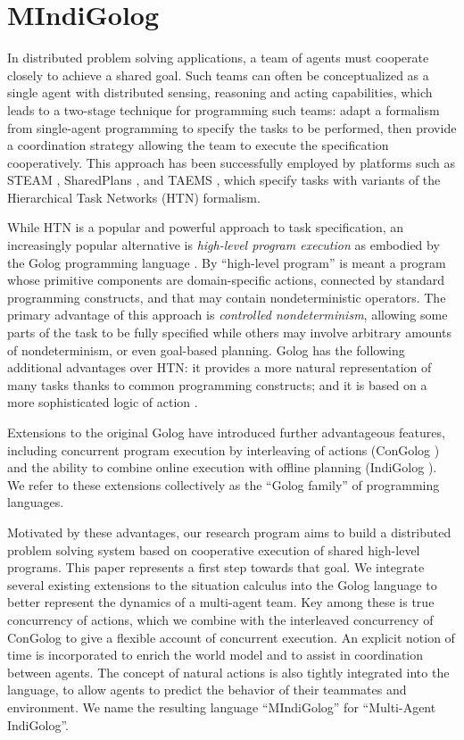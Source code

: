  


\chapter{MIndiGolog}

\label{ch:mindigolog} 

In distributed problem solving applications, a team of agents must
cooperate closely to achieve a shared goal. Such teams can often be
conceptualized as a single agent with distributed sensing, reasoning
and acting capabilities, which leads to a two-stage technique for
programming such teams: adapt a formalism from single-agent programming
to specify the tasks to be performed, then provide a coordination
strategy allowing the team to execute the specification cooperatively.
This approach has been successfully employed by platforms such as
STEAM \cite{tambe97flexible_teamwork}, SharedPlans \cite{grosz99planning_together},
and TAEMS \cite{decker95designing_coordination}, which specify tasks
with variants of the Hierarchical Task Networks (HTN) formalism.

While HTN is a popular and powerful approach to task specification,
an increasingly popular alternative is \emph{high-level program execution}
as embodied by the Golog programming language \cite{levesque97golog}.
By {}``high-level program'' is meant a program whose primitive components
are domain-specific actions, connected by standard programming constructs,
and that may contain nondeterministic operators. The primary advantage
of this approach is \emph{controlled nondeterminism}, allowing some
parts of the task to be fully specified while others may involve arbitrary
amounts of nondeterminism, or even goal-based planning. Golog has
the following additional advantages over HTN: it provides a more natural
representation of many tasks thanks to common programming constructs;
and it is based on a more sophisticated logic of action \cite{son00htn_golog}.

Extensions to the original Golog have introduced further advantageous
features, including concurrent program execution by interleaving of
actions (ConGolog \cite{giacomo00congolog}) and the ability to combine
online execution with offline planning (IndiGolog \cite{giacomo99indigolog}).
We refer to these extensions collectively as the {}``Golog family''
of programming languages.

Motivated by these advantages, our research program aims to build
a distributed problem solving system based on cooperative execution
of shared high-level programs. This paper represents a first step
towards that goal. We integrate several existing extensions to the
situation calculus into the Golog language to better represent the
dynamics of a multi-agent team. Key among these is true concurrency
of actions, which we combine with the interleaved concurrency of ConGolog
to give a flexible account of concurrent execution. An explicit notion
of time is incorporated to enrich the world model and to assist in
coordination between agents. The concept of natural actions is also
tightly integrated into the language, to allow agents to predict the
behavior of their teammates and environment. We name the resulting
language {}``MIndiGolog'' for {}``Multi-Agent IndiGolog''.

